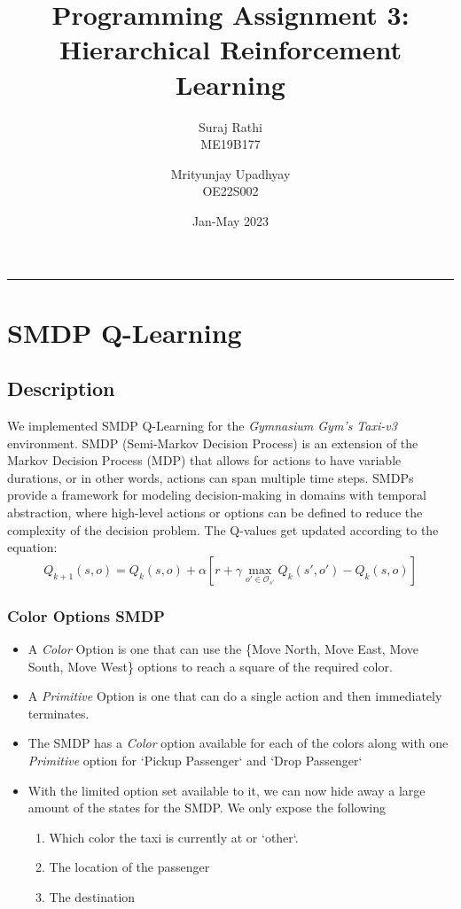 \documentclass[A4]{article}
\title{Programming Assignment 3: Hierarchical Reinforcement Learning}
\date{Jan-May 2023}
\author{Suraj Rathi\\ ME19B177
\and Mrityunjay Upadhyay \\ OE22S002}
\begin{document}
    \maketitle
    \hrule


    \section{SMDP Q-Learning}

    \subsection{Description}

    \noindent We implemented SMDP Q-Learning for the \emph{Gymnasium Gym’s Taxi-v3} environment.
    SMDP (Semi-Markov Decision Process) is an extension of the Markov Decision Process (MDP) that allows for actions to have variable durations, or in other words, actions can span multiple time steps.
    SMDPs provide a framework for modeling decision-making in domains with temporal abstraction, where high-level actions or options can be defined to reduce the complexity of the decision problem.
    The Q-values get updated according to the equation:
    \[Q_{k+1}(s, o) = Q_k(s, o) + \alpha [r + \gamma \max_{o' \in \mathcal{O}_{s'}} Q_k(s', o') - Q_k(s, o)]\]

    \subsubsection{Color Options SMDP}
    \begin{itemize}
        \item A \emph{Color} Option is one that can use the \{Move North, Move East, Move South, Move West\} options to reach a square of the required color.
        \item A \emph{Primitive} Option is one that can do a single action and then immediately terminates.
        \item The SMDP has a \emph{Color} option available for each of the colors along with one \emph{Primitive} option for `Pickup Passenger` and `Drop Passenger`
        \item With the limited option set available to it, we can now hide away a large amount of the states for the SMDP. We only expose the following
        \begin{enumerate}
            \item Which color the taxi is currently at or `other`.
            \item The location of the passenger
            \item The destination
        \end{enumerate}
    \end{itemize}
\end{document}
